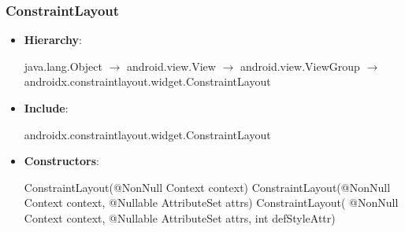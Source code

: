 \documentclass{report}
\begin{document}
    \subsubsection{ConstraintLayout}
    \begin{itemize}
        \item \textbf{Hierarchy}: 
            \begin{center}
                java.lang.Object $\to $	android.view.View $\to $	android.view.ViewGroup $\to $	androidx.constraintlayout.widget.ConstraintLayout
            \end{center}
        \item \textbf{Include}:
            \bigbreak \noindent 
            \begin{javacode}
            androidx.constraintlayout.widget.ConstraintLayout
            \end{javacode}
        \item \textbf{Constructors}:
            \bigbreak \noindent 
            \begin{javacode}
                ConstraintLayout(@NonNull Context context)
                ConstraintLayout(@NonNull Context context, @Nullable AttributeSet attrs)
                ConstraintLayout( @NonNull Context context, @Nullable AttributeSet attrs, int defStyleAttr)


\end{javacode}
\end{itemize}
\end{document}

